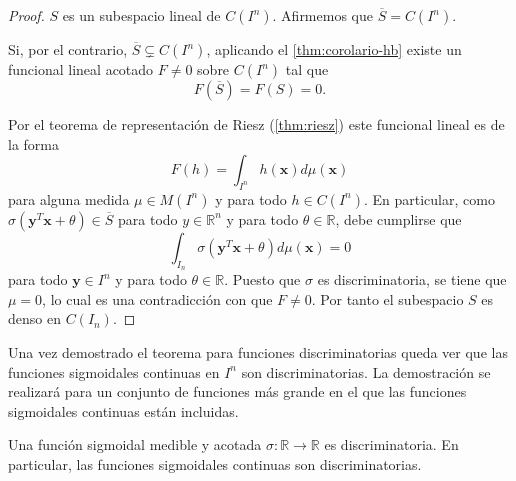 \begin{proof}
$S$ es un subespacio lineal de $C(I^n)$. Afirmemos que $\overline{S} = C(I^n)$.

Si, por el contrario, $ \overline{S} \subsetneq C(I^n)$, aplicando el \autoref{thm:corolario-hb} existe un funcional lineal acotado $F \neq 0$ sobre $C(I^n)$ tal que $$F(\overline{S}) = F(S) = 0.$$

Por el teorema de representación de Riesz (\autoref{thm:riesz}) este funcional lineal es de la forma $$F(h) = \int_{I^n}h(\textbf{x})d\mu(\textbf{x})$$ para alguna medida $\mu \in M(I^n)$ y para todo $h \in C(I^n)$. En particular, como $\sigma(\textbf{y}^T\textbf{x} + \theta) \in \overline{S}$ para todo $y \in \mathbb{R}^n$ y para todo $\theta \in \mathbb{R}$, debe cumplirse que $$\int_{I_n}\sigma(\textbf{y}^T\textbf{x} + \theta)d\mu(\textbf{x}) = 0 $$ para todo $\textbf{y} \in I^n$ y para todo $\theta \in \mathbb{R}$. Puesto que $\sigma$ es discriminatoria, se tiene que $\mu = 0$, lo cual es una contradicción con que $F \neq 0$. Por tanto el subespacio $S$ es denso en $C(I_n)$.
\end{proof}

Una vez demostrado el teorema para funciones discriminatorias queda ver que las funciones sigmoidales continuas en $I^n$ son discriminatorias. La demostración se realizará para un conjunto de funciones más grande en el que las funciones sigmoidales continuas están incluidas.

\begin{lema}\label{thm:lema-sigmoidal}
Una función sigmoidal medible y acotada $\sigma : \mathbb{R} \rightarrow \mathbb{R}$ es discriminatoria. En particular, las funciones sigmoidales continuas son discriminatorias.
\end{lema}

